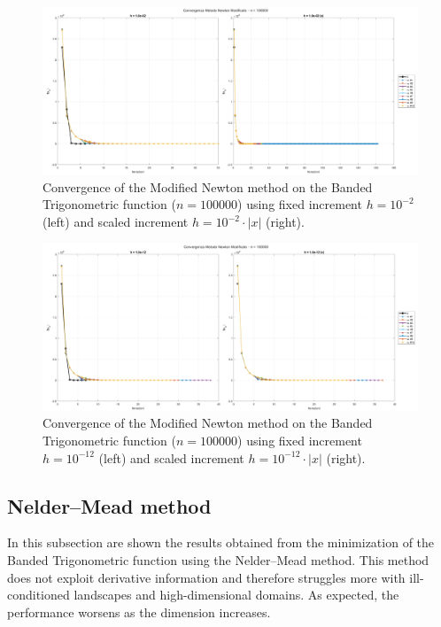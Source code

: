 \documentclass[a4paper,12pt]{article}
\begin{document}
\begin{itemize}
\begin{table}[H]
	\end{table}
	\newpage
	\begin{figure}[H]
		\centering
		\includegraphics[width=\textwidth]{../immagini/banded_100k_h2.png}
		\caption{Convergence of the Modified Newton method on the Banded Trigonometric function ($n=100000$) using fixed increment $h = 10^{-2}$ (left) and scaled increment $h = 10^{-2}\cdot|x|$ (right).}
		\label{fig:bt_fd_100k_h2}
	\end{figure}
	
	\begin{figure}[H]%
		\centering
		\includegraphics[width=\textwidth]{../immagini/banded_100k_h12.png}
		\caption{Convergence of the Modified Newton method on the Banded Trigonometric function ($n=100000$) using fixed increment $h = 10^{-12}$ (left) and scaled increment $h = 10^{-12}\cdot|x|$ (right).}
		\label{fig:bt_fd_100k_h12}
	\end{figure}
	
\end{itemize}

	\newpage
	\subsection{Nelder–Mead method}
	In this subsection are shown the results obtained from the minimization of the Banded Trigonometric function using the Nelder--Mead method. This method does not exploit derivative information and therefore struggles more with ill-conditioned landscapes and high-dimensional domains. As expected, the performance worsens as the dimension increases.\\
	
\end{document}
